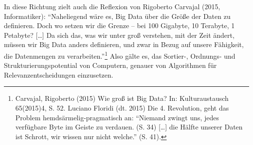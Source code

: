 \documentclass[a4paper,
fontsize=11pt,
oneside,
numbers=noperiodatend,
parskip=half-,
bibliography=totoc,
final
]{scrartcl}
\begin{document}
In diese Richtung zielt auch die Reflexion von Rigoberto Carvajal (2015,
Informatiker): \enquote{Naheliegend wäre es, Big Data über die Größe der
Daten zu definieren. Doch wo setzen wir die Grenze -- bei 100 Gigabyte,
10 Terabyte, 1 Petabyte? {[}\ldots{}{]} Da sich das, was wir unter groß
verstehen, mit der Zeit ändert, müssen wir Big Data anders definieren,
und zwar in Bezug auf unsere Fähigkeit, die Datenmengen zu
verarbeiten.}\footnote{Carvajal, Rigoberto (2015) Wie groß ist Big Data?
  In: Kulturaustausch 65(2015)4, S. 52. Luciano Floridi (dt. 2015) Die
  4. Revolution, geht das Problem hemdsärmelig-pragmatisch an:
  \enquote{Niemand zwingt uns, jedes verfügbare Byte im Geiste zu
  verdauen. (S. 34) {[}\ldots{}{]} die Hälfte unserer Daten ist Schrott,
  wir wissen nur nicht welche.} (S. 41).} Also gälte es, das Sortier-,
Ordnungs- und Strukturierungspotential von Computern, genauer von
Algorithmen für Relevanzentscheidungen einzusetzen.
\end{document}
